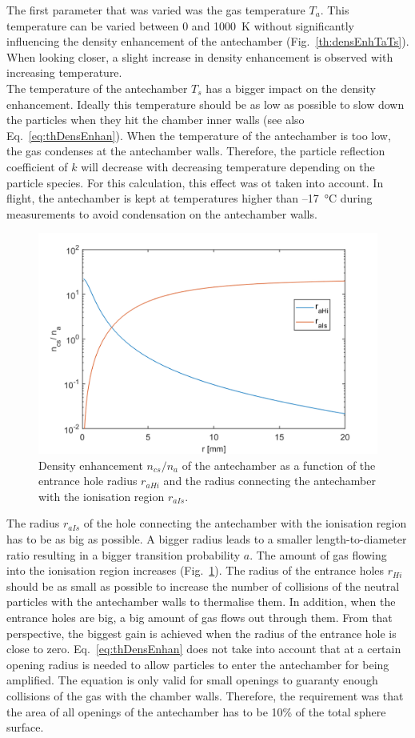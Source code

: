 	The first parameter that was varied was the gas temperature $T_a$. This temperature can be varied between 0 and 1000~K without significantly influencing the density enhancement of the antechamber (Fig.~\ref{th:densEnhTaTs}). When looking closer, a slight increase in density enhancement is observed with increasing temperature.\\
	The temperature of the antechamber $T_s$ has a bigger impact on the density enhancement. Ideally this temperature should be as low as possible to slow down the particles when they hit the chamber inner walls (see also Eq.~\eqref{eq:thDensEnhan}). When the temperature of the antechamber is too low, the gas condenses at the antechamber walls. Therefore, the particle reflection coefficient of $k$ will decrease with decreasing temperature depending on the particle species. For this calculation, this effect was ot taken into account. In flight, the antechamber is kept at temperatures higher than --17~\si{\degreeCelsius} during measurements to avoid condensation on the antechamber walls.\\
	\begin{figure}[H] %
		\centering
		\includegraphics[width= .7\textwidth]{Bilder/raHi_raIs.png}
		\caption{Density enhancement $n_{cs}/n_a$ of the antechamber as a function of the entrance hole radius $r_{aHi}$ and the radius connecting the antechamber with the ionisation region $r_{aIs}$.}
		\label{th:densEnhraHiraIs}
	\end{figure}
	The radius $r_{aIs}$ of the hole connecting the antechamber with the ionisation region has to be as big as possible. A bigger radius leads to a smaller length-to-diameter ratio resulting in a bigger transition probability $a$. The amount of gas flowing into the ionisation region increases (Fig.~\ref{th:densEnhraHiraIs}). The radius of the entrance holes $r_{Hi}$ should be as small as possible to increase the number of collisions of the neutral particles with the antechamber walls to thermalise them. In addition, when the entrance holes are big, a big amount of gas flows out through them. From that perspective, the biggest gain is achieved when the radius of the entrance hole is close to zero. Eq.~\eqref{eq:thDensEnhan} does not take into account that at a certain opening radius is needed to allow particles to enter the antechamber for being amplified. The equation is only valid for small openings to guaranty enough collisions of the gas with the chamber walls. Therefore, the requirement was that the area of all openings of the antechamber has to be 10\% of the total sphere surface.\\
